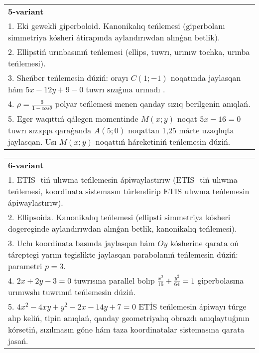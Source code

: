 \documentclass{article}
\begin{document}
\begin{tabular}{m{17cm}}
\textbf{5-variant}\\
1. Eki gewekli giperboloid. Kanonikalıq teńlemesi (giperbolanı simmetriya kósheri átirapında aylandırıwdan alınǵan betlik).\\

2. Ellipstiń urınbasınıń teńlemesi (ellips, tuwrı, urınıw tochka, urınba teńlemesi).\\

3. Sheńber teńlemesin dúziń: orayı $C (1;-1) $ noqatında jaylasqan hám $5 x-12 y+9 -0$ tuwrı sızıǵına urınadı .\\

4. $\rho = \frac{6}{1 - cos\theta}$ polyar teńlemesi menen qanday sızıq berilgenin anıqlań.  \\

5. Eger waqıttıń qálegen momentinde $M(x;y)$ noqat $5x - 16 = 0$ tuwrı sızıqqa qaraǵanda $A(5;0)$ noqattan 1,25 márte uzaqlıqta jaylasqan. Usı $M(x;y)$ noqattıń háreketiniń teńlemesin dúziń.  
\end{tabular}
\vspace{1cm}


\begin{tabular}{m{17cm}}
\textbf{6-variant}\\
1. ETIS -tiń ulıwma teńlemesin ápiwaylastırıw (ETIS -tiń ulıwma teńlemesi, koordinata sistemasın túrlendirip ETIS ulıwma teńlemesin ápiwaylastırıw).\\

2. Ellipsoida. Kanonikalıq teńlemesi (ellipsti simmetriya kósheri dogereginde aylandırıwdan alınǵan betlik, kanonikalıq teńlemesi).\\

3. Uchı koordinata basında jaylasqan hám $Oy$ kósherine qarata oń táreptegi yarım tegislikte jaylasqan parabolanıń teńlemesin dúziń: parametri $p=3$.\\

4. $2x + 2y - 3 = 0$ tuwrısına parallel bolıp $\frac{x^{2}}{16} + \frac{y^{2}}{64} = 1$ giperbolasına urınıwshı tuwrınıń teńlemesin dúziń.  \\

5. $4x^{2} - 4xy + y^{2} - 2x - 14y + 7 = 0$ ETİS teńlemesin ápiwayı túrge alıp keliń, tipin anıqlań, qanday geometriyalıq obrazdı anıqlaytuǵının kórsetiń, sızılmasın góne hám taza koordinatalar sistemasına qarata jasań.  
\end{tabular}
\vspace{1cm}
\end{document}
